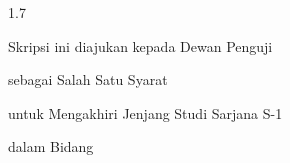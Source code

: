 
\setcounter{page}{2}

\newpage
{}
{}
\begin{spacing}{1.7}
\bfseries
\begin{center}
\thesiscoverhead
\vfill
{\fontsize{11pt}{13pt}\selectfont
Skripsi ini diajukan kepada Dewan Penguji\par
\facultyname{} \institutionname\par
sebagai Salah Satu Syarat\par
untuk Mengakhiri Jenjang Studi Sarjana S-1\par
dalam Bidang \departmentname\par
\academicyear\par}
\end{center}
\end{spacing}

